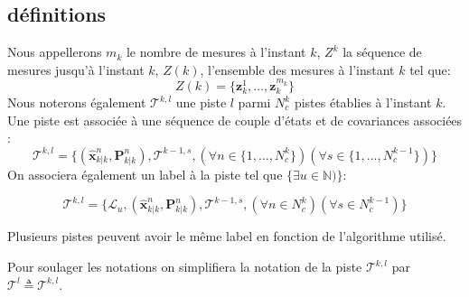 \documentclass[10pt,french,a4paper]{report}
\begin{document}
									\subsection{définitions}
									\label{mult:definitions}
									Nous appellerons $m_k$ le nombre de mesures à l'instant $k$, $Z^k$ la séquence de mesures jusqu'à l'instant $k$, $Z(k)$, l'ensemble des mesures à l'instant $k$ tel que:
							\begin{equation} 
							Z(k) = \{ \mathbf{z}^1_k, \ldots, \mathbf{z}^{m_k}_k\}						
							\end{equation}	
									Nous noterons également $\mathcal{T}^{k,l}$ une piste $l$ parmi $N_c^k$ pistes établies à l'instant $k$. Une piste est associée à une séquence de couple d'états et de covariances associées :
									\begin{equation} 
									\mathcal{T}^{k,l} = \{ (\hat{\mathbf{x}}^n_{k|k},\mathbf{P}^n_{k|k}), \mathcal{T}^{k-1,s}, (\forall n \in \{1,\ldots,N_c^k\})( \forall s \in \{1,\ldots,N_c^{k-1}\} )\}			 						
							\end{equation}								
				On associera également un label à la piste tel que $\{\exists u \in \mathbb{N})\}$: 
									 
													\begin{equation} 
									\mathcal{T}^{k,l} = \{ \mathcal{L}_u, (\hat{\mathbf{x}}^n_{k|k},\mathbf{P}^n_{k|k}), \mathcal{T}^{k-1,s}, (\forall n \in N_c^k)( \forall s \in N_c^{k-1} )\}			 						
							\end{equation}		
									
									Plusieurs pistes peuvent avoir le même label en fonction de l'algorithme utilisé. 

Pour soulager les notations on simplifiera la notation de la piste $\mathcal{T}^{k,l}$ par $\mathcal{T}^{l} \triangleq	\mathcal{T}^{k,l}$.								
									
\end{document}
